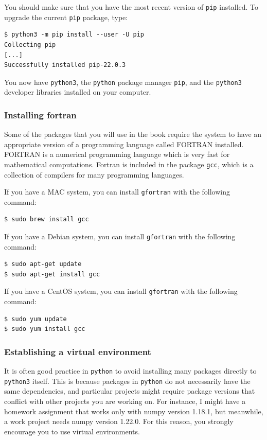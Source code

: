 You should make sure that you have the most recent version of \texttt{pip} installed. To upgrade the current \texttt{pip} package, type:

\begin{lstlisting}[style=bash]
$ python3 -m pip install --user -U pip
Collecting pip
[...]
Successfully installed pip-22.0.3
\end{lstlisting}

You now have \texttt{python3}, the \texttt{python} package manager \texttt{pip}, and the \texttt{python3} developer libraries installed on your computer. 

\subsubsection{Installing fortran}

Some of the packages that you will use in the book require the system to have an appropriate version of a programming language called FORTRAN installed. FORTRAN is a numerical programming language which is very fast for mathematical computations. Fortran is included in the package \texttt{gcc}, which is a collection of compilers for many programming languages.

If you have a MAC system, you can install \texttt{gfortran} with the following command:

\begin{lstlisting}[style=bash]
$ sudo brew install gcc
\end{lstlisting}

If you have a Debian system, you can install \texttt{gfortran} with the following command:

\begin{lstlisting}[style=bash]
$ sudo apt-get update
$ sudo apt-get install gcc
\end{lstlisting}

If you have a CentOS system, you can install \texttt{gfortran} with the following command:

\begin{lstlisting}[style=bash]
$ sudo yum update
$ sudo yum install gcc
\end{lstlisting}

\subsubsection{Establishing a virtual environment}

It is often good practice in \texttt{python} to avoid installing many packages directly to \texttt{python3} itself. This is because packages in \texttt{python} do not necessarily have the same dependencies, and particular projects might require package versions that conflict with other projects you are working on. For instance, I might have a homework assignment that works only with numpy version 1.18.1, but meanwhile, a work project needs numpy version 1.22.0. For this reason, you strongly encourage you to use virtual environments.

